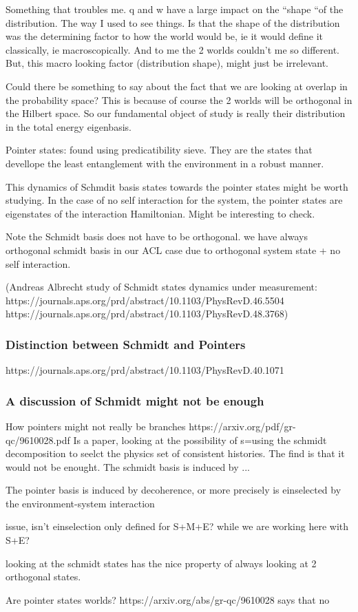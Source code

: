 \documentclass{article}
\begin{document}
Something that troubles me. q and w have a large impact on the  “shape “of the distribution. The way I used to see things. Is that the shape of the distribution was the determining factor to how the world would be, ie it would define it classically, ie macroscopically. And to me the 2 worlds couldn’t me so different. But, this macro looking factor (distribution shape), might just be irrelevant.  

Could there be something to say about the fact that we are looking at overlap in the probability space? This is because of course the 2 worlds will be orthogonal in the Hilbert space. 
So our fundamental object of study is really their distribution in the total energy eigenbasis.



Pointer states: found using predicatibility sieve. They are the states that devellope the least entanglement with the environment in a robust manner.

This dynamics of Schmdit basis states towards the pointer states might be worth studying. In the case of no self interaction for the system, the pointer states are eigenstates of the interaction Hamiltonian. Might be interesting to check.

Note the Schmidt basis does not have to be orthogonal.
we have always orthogonal schmidt basis in our ACL case due to orthogonal system state + no self interaction.

(Andreas Albrecht study of Schmidt states dynamics under measurement:
https://journals.aps.org/prd/abstract/10.1103/PhysRevD.46.5504
https://journals.aps.org/prd/abstract/10.1103/PhysRevD.48.3768)

\subsubsection{Distinction between Schmidt and Pointers}
https://journals.aps.org/prd/abstract/10.1103/PhysRevD.40.1071



\subsubsection{A discussion of Schmidt might not be enough}
How pointers might not really be branches https://arxiv.org/pdf/gr-qc/9610028.pdf
Is a paper, looking at the possibility of s=using the schmidt decomposition to seelct the physics set of consistent histories. The find is that it would not be enought.
The schmidt basis is induced by ...

The pointer basis is induced by decoherence, or more precisely is einselected by the environment-system interaction

issue, isn't einselection only defined for S+M+E? while we are working here with S+E?

looking at the schmidt states has the nice property of always looking at 2 orthogonal states.

Are pointer states worlds? https://arxiv.org/abs/gr-qc/9610028 says that no
\end{document}
